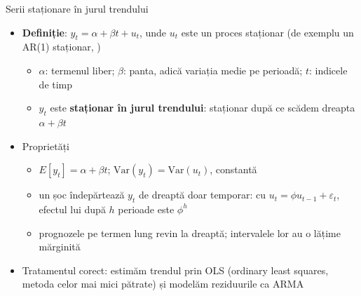 \begin{frame}{Serii staționare în jurul trendului}
\itemsize{\small}
\begin{itemize}
    \item \textbf{Definiție}: $y_t = \alpha + \beta t + u_t$, unde $u_t$ este un proces staționar (de exemplu un AR(1) staționar, )
    \begin{itemize}
        \item $\alpha$: termenul liber; $\beta$: panta, adică variația medie pe perioadă; $t$: indicele de timp
        \item $y_t$ este \textbf{staționar în jurul trendului}: staționar după ce scădem dreapta $\alpha + \beta t$
    \end{itemize}
    \item Proprietăți
    \begin{itemize}
        \item $E[y_t] = \alpha + \beta t$; $\mathrm{Var}(y_t) = \mathrm{Var}(u_t)$, constantă
        \item un șoc îndepărtează $y_t$ de dreaptă doar temporar: cu $u_t = \phi u_{t-1} + \varepsilon_t$, efectul lui după $h$ perioade este $\phi^h$
        \item prognozele pe termen lung revin la dreaptă; intervalele lor au o lățime mărginită
    \end{itemize}
    \item Tratamentul corect: estimăm trendul prin OLS (ordinary least squares, metoda celor mai mici pătrate) și modelăm reziduurile ca ARMA
\end{itemize}
\end{frame}

